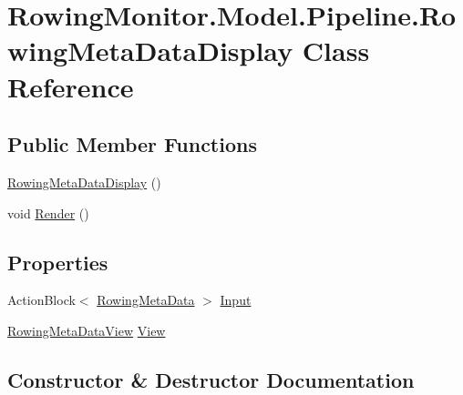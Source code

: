 \hypertarget{class_rowing_monitor_1_1_model_1_1_pipeline_1_1_rowing_meta_data_display}{}\section{Rowing\+Monitor.\+Model.\+Pipeline.\+Rowing\+Meta\+Data\+Display Class Reference}
\label{class_rowing_monitor_1_1_model_1_1_pipeline_1_1_rowing_meta_data_display}
\subsection*{Public Member Functions}
\begin{DoxyCompactItemize}
\item 
\hyperlink{class_rowing_monitor_1_1_model_1_1_pipeline_1_1_rowing_meta_data_display_af99f95d496ff4c18b1012286fc8dcbb3}{Rowing\+Meta\+Data\+Display} ()
\item 
void \hyperlink{class_rowing_monitor_1_1_model_1_1_pipeline_1_1_rowing_meta_data_display_a73ff15aa666d19e526b7698de87dd398}{Render} ()
\end{DoxyCompactItemize}
\subsection*{Properties}
\begin{DoxyCompactItemize}
\item 
Action\+Block$<$ \hyperlink{struct_rowing_monitor_1_1_model_1_1_util_1_1_rowing_meta_data}{Rowing\+Meta\+Data} $>$ \hyperlink{class_rowing_monitor_1_1_model_1_1_pipeline_1_1_rowing_meta_data_display_a6289c31bcb1808a30d3f630af30154b8}{Input}
\item 
\hyperlink{class_rowing_monitor_1_1_view_1_1_rowing_meta_data_view}{Rowing\+Meta\+Data\+View} \hyperlink{class_rowing_monitor_1_1_model_1_1_pipeline_1_1_rowing_meta_data_display_a669135bac2cb6137ae5f0bff1122d02f}{View}
\end{DoxyCompactItemize}


\subsection{Constructor \& Destructor Documentation}
\mbox{\label{class_rowing_monitor_1_1_model_1_1_pipeline_1_1_rowing_meta_data_display_af99f95d496ff4c18b1012286fc8dcbb3}} 
